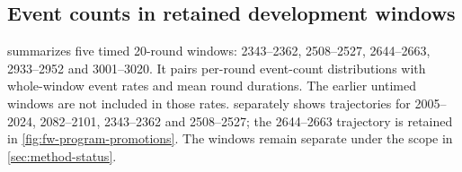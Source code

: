 \subsection{Event counts in retained development windows}\label{app:event-counts}

 summarizes five timed 20-round windows:
2343--2362, 2508--2527, 2644--2663, 2933--2952 and 3001--3020. It pairs
per-round event-count distributions with whole-window event rates and mean
round durations. The earlier untimed windows are not included in those rates.
 separately shows trajectories for
2005--2024, 2082--2101, 2343--2362 and 2508--2527; the 2644--2663
trajectory is retained in \cref{fig:fw-program-promotions}.
The windows remain separate under the scope in \cref{sec:method-status}.
